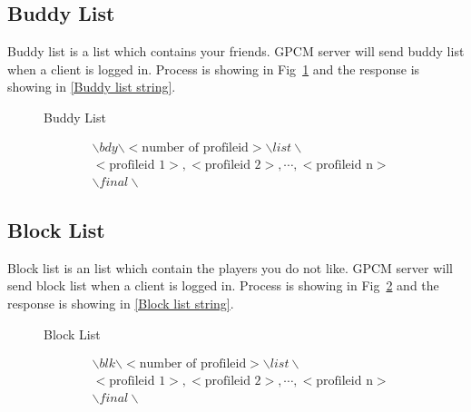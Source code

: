 \documentclass[oneside,titlepage,a4paper]{Definition/retrospy} %
\begin{document}
\subsection{Buddy List}
Buddy list is a list which contains your friends.
GPCM server will send buddy list when a client is logged in. Process is showing in Fig~\ref{Buddy List} and the response is showing in \ref{Buddy list string}.
\begin{figure}[H]
	\centering
	\caption{Buddy List}
	\label{Buddy List}
\end{figure}

\begin{tcolorbox}\label{Buddy list string}
	\begin{equation}
	\begin{split}
	&\backslash bdy \backslash < \text{number of profileid} > \backslash list \backslash \\ &<\text{profileid 1}>,<\text{profileid 2}>,\cdots,<\text{profileid n}>\\
	&\backslash final \backslash
	\end{split}
	\end{equation}
\end{tcolorbox}


\subsection{Block List}
Block list is an list which contain the players you do not like.
GPCM server will send block list when a client is logged in. Process is showing in Fig~\ref{Block List} and the response is showing in \ref{Block list string}.
\begin{figure}[H]
	\centering
	\caption{Block List}
	\label{Block List}
\end{figure}

\begin{tcolorbox}\label{Block list string}
	\begin{equation}
	\begin{split}
	&\backslash blk \backslash < \text{number of profileid} > \backslash list \backslash \\ &<\text{profileid 1}>,<\text{profileid 2}>,\cdots,<\text{profileid n}>\\
	&\backslash final \backslash
	\end{split}
	\end{equation}
\end{tcolorbox}
\end{document}

